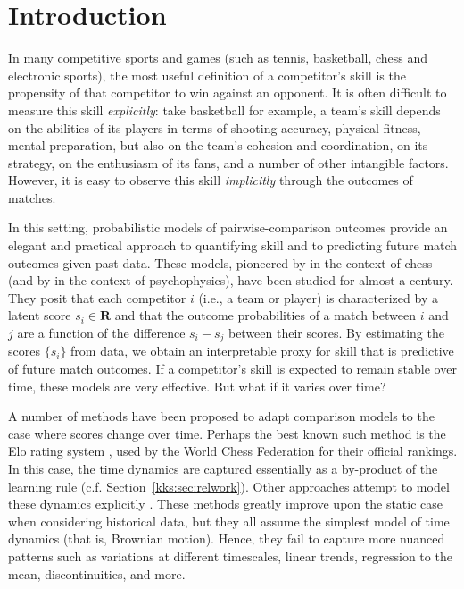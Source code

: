 \section{Introduction}
\label{kks:sec:intro}

In many competitive sports and games (such as tennis, basketball, chess and electronic sports), the most useful definition of a competitor's skill is the propensity of that competitor to win against an opponent.
It is often difficult to measure this skill \emph{explicitly}:
take basketball for example, a team's skill depends on the abilities of its players in terms of shooting accuracy, physical fitness, mental preparation, but also on the team's cohesion and coordination, on its strategy, on the enthusiasm of its fans, and a number of other intangible factors.
However, it is easy to observe this skill \emph{implicitly} through the outcomes of matches.

In this setting, probabilistic models of pairwise-comparison outcomes provide an elegant and practical approach to quantifying skill and to predicting future match outcomes given past data.
These models, pioneered by \citet{zermelo1928berechnung} in the context of chess (and by \citet{thurstone1927law} in the context of psychophysics), have been studied for almost a century.
They posit that each competitor $i$ (i.e., a team or player) is characterized by a latent score $s_i \in \mathbf{R}$ and that the outcome probabilities of a match between $i$ and $j$ are a function of the difference $s_i - s_j$ between their scores.
By estimating the scores $\{ s_i \}$ from data, we obtain an interpretable proxy for skill that is predictive of future match outcomes.
If a competitor's skill is expected to remain stable over time, these models are very effective.
But what if it varies over time?

A number of methods have been proposed to adapt comparison models to the case where scores change over time.
Perhaps the best known such method is the Elo rating system \citep{elo1978rating}, used by the World Chess Federation for their official rankings.
In this case, the time dynamics are captured essentially as a by-product of the learning rule (c.f. Section~\ref{kks:sec:relwork}).
Other approaches attempt to model these dynamics explicitly \citep[e.g.,][]{fahrmeir1994dynamic, glickman1999parameter, dangauthier2007trueskill, coulom2008whole}.
These methods greatly improve upon the static case when considering historical data, but they all assume the simplest model of time dynamics (that is, Brownian motion).
Hence, they fail to capture more nuanced patterns such as variations at different timescales, linear trends, regression to the mean, discontinuities, and more.

